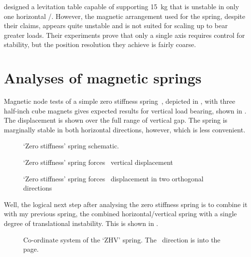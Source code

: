 \textcite{choi2003} designed a levitation table capable of supporting \SI{15}{kg} that is unstable in only one horizontal \dof/.
However, the magnetic arrangement used for the spring, despite their claims, appears quite unstable and is not suited for scaling up to bear greater loads.
Their experiments prove that only a single axis requires control for stability, but the position resolution they achieve is fairly coarse.

\section{Analyses of magnetic springs}

Magnetic node tests of a simple zero stiffness
spring~\cite{nijsse2001}, depicted in
, with three half-inch cube magnets
gives expected results for vertical load bearing, shown in
. The displacement is shown over the full
range of vertical gap. The spring is marginally stable in both
horizontal directions, however, which is less convenient.
\begin{figure}
  \centering
  \caption{`Zero stiffness' spring schematic.}
\end{figure}

\begin{figure}
  \centering
  \caption{`Zero stiffness' spring forces \vs\ vertical displacement}
\end{figure}

\begin{figure}
  \centering
  \caption{`Zero stiffness' spring forces \vs\ displacement in two orthogonal directions}
\end{figure}



Well, the logical next step after analysing the zero stiffness spring
is to combine it with my previous spring, the combined
horizontal/vertical spring with a single degree of translational
instability. This is shown in .

\begin{figure}
   \centering
   \caption{Co-ordinate system of the `ZHV' spring. The \y\ direction is into the page.}
\end{figure}

